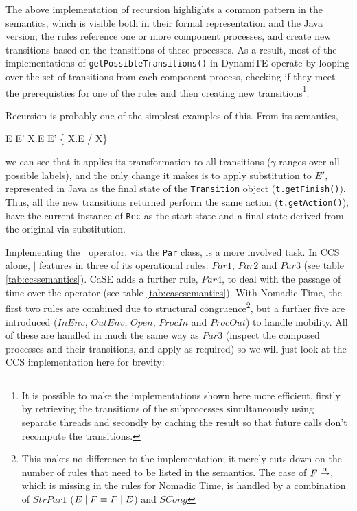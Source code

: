 The above implementation of recursion highlights a common pattern in
the semantics, which is visible both in their formal representation
and the Java version; the rules reference one or more component
processes, and create new transitions based on the transitions of
these processes.  As a result, most of the implementations of
\texttt{getPossibleTransitions()} in DynamiTE operate by looping over
the set of transitions from each component process, checking if they
meet the prerequisties for one of the rules and then creating new
transitions\footnote{It is possible to make the implementations shown
  here more efficient, firstly by retrieving the transitions of the
  subprocesses simultaneously using separate threads and secondly by
  caching the result so that future calls don't recompute the
  transitions.}.

Recursion is probably one of the simplest examples of this.  From its
semantics,
\begin{center}
      {E \derives{\gamma} E'}
      {\mu X.E \derives{\gamma} E' \{ \mu X.E / X\}}
      {}
\end{center}
\noindent we can see that it applies its transformation to all
transitions ($\gamma$ ranges over all possible labels), and the only
change it makes is to apply substitution to $E'$, represented in Java
as the final state of the \texttt{Transition} object
(\texttt{t.getFinish()}).  Thus, all the new transitions returned
perform the same action (\texttt{t.getAction()}), have the current
instance of \texttt{Rec} as the start state and a final state derived
from the original via substitution.

Implementing the $\mid$ operator, via the \texttt{Par} class, is a
more involved task.  In CCS alone, $\mid$ features in three of its
operational rules: $Par1$, $Par2$ and $Par3$ (see table
\ref{tab:ccssemantics}).  CaSE adds a further rule, $Par4$, to deal
with the passage of time over the operator (see table
\ref{tab:casesemantics}).  With Nomadic Time, the first two rules are
combined due to structural congruence\footnote{This makes no
  difference to the implementation; it merely cuts down on the number
  of rules that need to be listed in the semantics.  The case of $F
  \stackrel{\alpha}{\rightarrow}$, which is missing in the rules for Nomadic Time,
  is handled by a combination of $StrPar1$ ($E \;|\; F \equiv F \;|\; E$)
  and $SCong$}, but a further five are introduced ($InEnv$, $OutEnv$,
$Open$, $ProcIn$ and $ProcOut$) to handle mobility.  All of these are
handled in much the same way as $Par3$ (inspect the composed processes
and their transitions, and apply as required) so we will just look at
the CCS implementation here for brevity:

